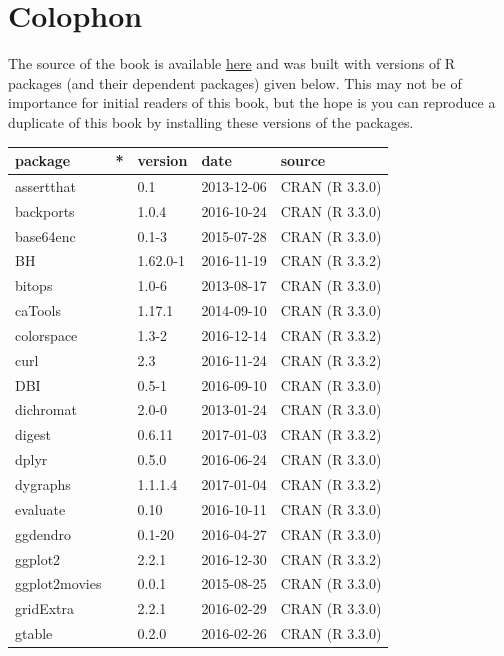 \documentclass[]{tufte-book}
\begin{document}
\section*{Colophon}\label{colophon}

The source of the book is available
\href{https://github.com/ismayc/moderndiver-book}{here} and was built
with versions of R packages (and their dependent packages) given below.
This may not be of importance for initial readers of this book, but the
hope is you can reproduce a duplicate of this book by installing these
versions of the packages.

\begin{longtable}{lllll}
\toprule
package & * & version & date & source\\
\midrule
assertthat &  & 0.1 & 2013-12-06 & CRAN (R 3.3.0)\\
backports &  & 1.0.4 & 2016-10-24 & CRAN (R 3.3.0)\\
base64enc &  & 0.1-3 & 2015-07-28 & CRAN (R 3.3.0)\\
BH &  & 1.62.0-1 & 2016-11-19 & CRAN (R 3.3.2)\\
bitops &  & 1.0-6 & 2013-08-17 & CRAN (R 3.3.0)\\
\addlinespace
caTools &  & 1.17.1 & 2014-09-10 & CRAN (R 3.3.0)\\
colorspace &  & 1.3-2 & 2016-12-14 & CRAN (R 3.3.2)\\
curl &  & 2.3 & 2016-11-24 & CRAN (R 3.3.2)\\
DBI &  & 0.5-1 & 2016-09-10 & CRAN (R 3.3.0)\\
dichromat &  & 2.0-0 & 2013-01-24 & CRAN (R 3.3.0)\\
\addlinespace
digest &  & 0.6.11 & 2017-01-03 & CRAN (R 3.3.2)\\
dplyr &  & 0.5.0 & 2016-06-24 & CRAN (R 3.3.0)\\
dygraphs &  & 1.1.1.4 & 2017-01-04 & CRAN (R 3.3.2)\\
evaluate &  & 0.10 & 2016-10-11 & CRAN (R 3.3.0)\\
ggdendro &  & 0.1-20 & 2016-04-27 & CRAN (R 3.3.0)\\
\addlinespace
ggplot2 &  & 2.2.1 & 2016-12-30 & CRAN (R 3.3.2)\\
ggplot2movies &  & 0.0.1 & 2015-08-25 & CRAN (R 3.3.0)\\
gridExtra &  & 2.2.1 & 2016-02-29 & CRAN (R 3.3.0)\\
gtable &  & 0.2.0 & 2016-02-26 & CRAN (R 3.3.0)\\

\end{longtable}
\end{document}
